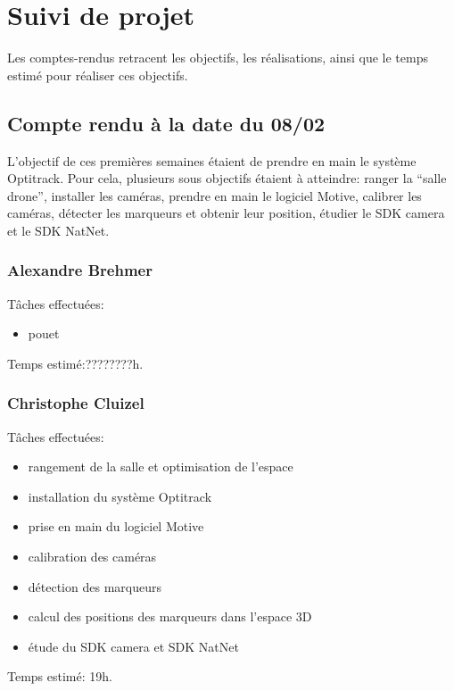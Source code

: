 \chapter{Suivi de projet}
Les comptes-rendus retracent les objectifs, les réalisations, ainsi que le temps estimé pour réaliser ces objectifs.

\section{Compte rendu à la date du 08/02}
L'objectif de ces premières semaines étaient de prendre en main le système Optitrack. Pour cela, plusieurs sous objectifs étaient à atteindre: ranger la ``salle drone'', installer les caméras, prendre en main le logiciel Motive, calibrer les caméras, détecter les marqueurs et obtenir leur position, étudier le SDK camera et le SDK NatNet.

\subsection{Alexandre Brehmer}
Tâches effectuées:
\begin{itemize}
	\item pouet \\
\end{itemize}

Temps estimé:????????h.


\subsection{Christophe Cluizel}

Tâches effectuées:
\begin{itemize}
	\item rangement de la salle et optimisation de l'espace
	\item installation du système Optitrack
	\item prise en main du logiciel Motive
	\item calibration des caméras
	\item détection des marqueurs
	\item calcul des positions des marqueurs dans l'espace 3D
	\item étude du SDK camera et SDK NatNet \\
\end{itemize}

Temps estimé: 19h.

